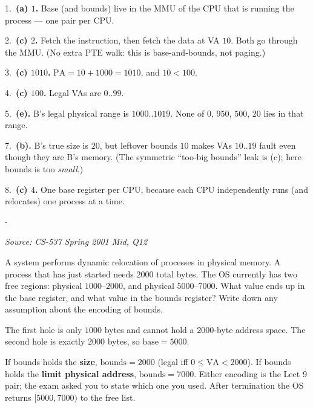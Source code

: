\documentclass[11pt,a4paper]{article}
\makeatletter
\newcommand{\keepspace}[1]{\par\penalty-100\begingroup
  \setlength{\dimen@}{#1}\dimen@ii\pagegoal\advance\dimen@ii-\pagetotal
  \ifdim\dimen@>\dimen@ii\ifdim\dimen@ii>\z@\vfil\fi\break\fi\endgroup}
\newcounter{qn}[section]
\newenvironment{Qn}[4]{%
  \refstepcounter{qn}\keepspace{7\baselineskip}%
  \begin{tcolorbox}[qboxstyle, title={Q\thesection.\theqn\ \ [#1 \textbar\ #2]\ \ #4}]%
  {\footnotesize\color{g3}\textit{Source: #3}}\par\smallskip%
}{%
  \end{tcolorbox}%
}
\newenvironment{Sol}{%
  \begin{tcolorbox}[sboxstyle, title={Solution}]%
}{%
  \end{tcolorbox}\vspace{0.35em}%
}
\makeatother
\begin{document}
\begin{Sol}
1.\ \textbf{(a) $1$.} Base (and bounds) live in the MMU of the CPU
that is running the process --- one pair per CPU.

2.\ \textbf{(c) $2$.} Fetch the instruction, then fetch the data at
VA $10$. Both go through the MMU. (No extra PTE walk: this is
base-and-bounds, not paging.)

3.\ \textbf{(c) $1010$.} $\mathrm{PA}=10+1000=1010$, and $10<100$.

4.\ \textbf{(c) $100$.} Legal VAs are $0..99$.

5.\ \textbf{(e).} B's legal physical range is $1000..1019$. None of
$0$, $950$, $500$, $20$ lies in that range.

7.\ \textbf{(b).} B's true size is $20$, but leftover bounds $10$
makes VAs $10..19$ fault even though they are B's memory. (The
symmetric ``too-big bounds'' leak is (c); here bounds is too
\emph{small}.)

8.\ \textbf{(c) $4$.} One base register per CPU, because each CPU
independently runs (and relocates) one process at a time.
\end{Sol}

\begin{Qn}{Medium}{Lect 9}{CS-537 Spring 2001 Mid, Q12}{Where does the new 2000-byte job go?}
A system performs dynamic relocation of processes in physical memory.
A process that has just started needs $2000$ total bytes. The OS
currently has two free regions: physical $1000$--$2000$, and physical
$5000$--$7000$. What value ends up in the base register, and what
value in the bounds register? Write down any assumption about the
encoding of bounds.
\end{Qn}
\begin{Sol}
The first hole is only $1000$ bytes and cannot hold a $2000$-byte
address space. The second hole is exactly $2000$ bytes, so
$\mathrm{base}=5000$.

If bounds holds the \textbf{size}, $\mathrm{bounds}=2000$
(legal iff $0\le\mathrm{VA}<2000$).
If bounds holds the \textbf{limit physical address},
$\mathrm{bounds}=7000$.
Either encoding is the Lect 9 pair; the exam asked you to state which
one you used. After termination the OS returns $[5000,7000)$ to the
free list.
\end{Sol}
\end{document}
